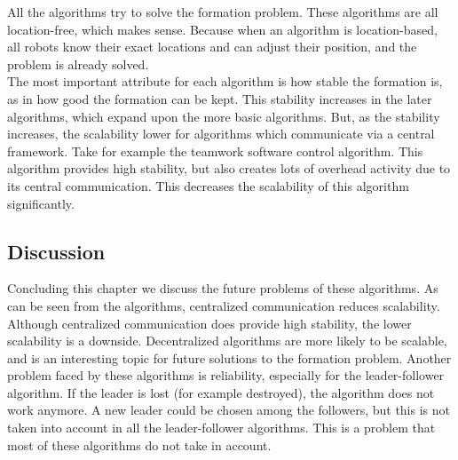 All the algorithms try to solve the formation problem. 
These algorithms are all location-free, which makes sense.  
Because when an algorithm is location-based, all robots know their exact locations and can adjust their position, and the problem is already solved. \\
The most important attribute for each algorithm is how stable the formation is, as in how good the formation can be kept. 
This stability increases in the later algorithms, which expand upon the more basic algorithms. 
But, as the stability increases, the scalability lower for algorithms which communicate via a central framework. 
Take for example the teamwork software control algorithm. 
This algorithm provides high stability, but also creates lots of overhead activity due to its central communication.
This decreases the scalability of this algorithm significantly.\\

\subsection{Discussion}
  \begin{table}[H]
  \renewcommand{\arraystretch}{1.3}
  \label{table_alg_formation}
  \centering
{}
  \caption{Overview of Formation Algorithms}
  \end{table}

Concluding this chapter we discuss the future problems of these algorithms. 
As can be seen from the algorithms, centralized communication reduces scalability. 
Although centralized communication does provide high stability, the lower scalability is a downside. 
Decentralized algorithms are more likely to be scalable, and is an interesting topic for future solutions to the formation problem.
Another problem faced by these algorithms is reliability, especially for the leader-follower algorithm. 
If the leader is lost (for example destroyed), the algorithm does not work anymore. 
A new leader could be chosen among the followers, but this is not taken into account in all the leader-follower algorithms. 
This is a problem that most of these algorithms do not take in account.  
